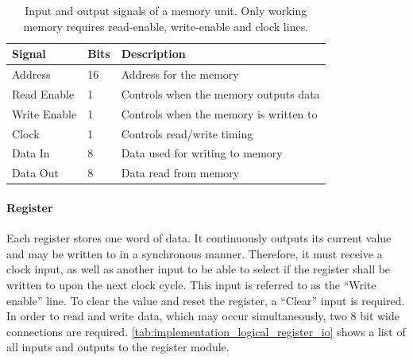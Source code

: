 \begin{table}[H]
    \centering
    \begin{tabular}{|l|l|l|} 
        \hline
        \textbf{\textbf{Signal}} & \textbf{Bits} & \textbf{Description}                    \\ 
        \hline
        Address                  & 16            & Address for the memory                  \\ 
        \hline
        Read Enable              & 1             & Controls when the memory outputs data   \\ 
        \hline
        Write Enable             & 1             & Controls when the memory is written to  \\ 
        \hline
        Clock                    & 1             & Controls read/write timing              \\ 
        \hline
        Data In                  & 8             & Data used for writing to memory         \\ 
        \hline
        Data Out                 & 8             & Data read from memory                   \\
        \hline
    \end{tabular}
    \caption[Input and output signals of a memory]{Input and output signals of a memory unit. Only working memory requires read-enable, write-enable and clock lines.}
    \label{tab:implementation_logical_memory_io}
\end{table}

\paragraph*{Register}

Each register stores one word of data. It continuously outputs its current value and may be written to in a synchronous manner. Therefore, it must receive a clock input, as well as another input to be able to select if the register shall be written to upon the next clock cycle. This input is referred to as the ``Write enable'' line. To clear the value and reset the register, a ``Clear'' input is required. In order to read and write data, which may occur simultaneously, two 8 bit wide connections are required. \autoref{tab:implementation_logical_register_io} shows a list of all inputs and outputs to the register module.

